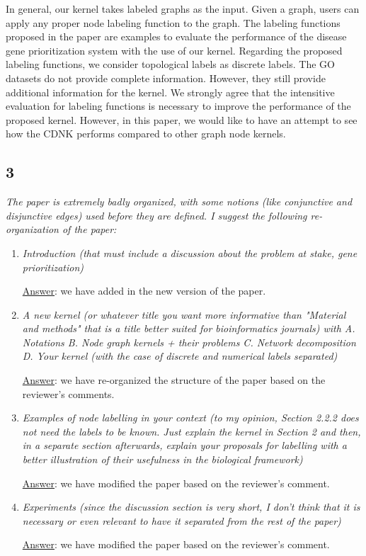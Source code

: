 \documentclass[11pt]{article}
\begin{document}
In general, our kernel takes labeled graphs as the input. Given a graph, users can apply any proper node labeling function to the graph.  The labeling functions proposed in the paper are examples to evaluate the performance of the disease gene prioritization system with the use of our kernel. Regarding the proposed labeling functions, we consider topological labels as discrete labels. The GO datasets do not provide complete information. However, they still provide additional information for the kernel. We strongly agree that the intensitive evaluation for labeling functions is necessary to improve the performance of the proposed kernel. However, in this paper, we would like to have an attempt to see how the CDNK performs compared to other graph node kernels.

\subsection*{3} \textit{The paper is extremely badly organized, with some notions (like conjunctive and disjunctive edges) used before they are defined. I suggest the following re-organization of the paper:}

\begin{enumerate}
\item \textit{Introduction (that must include a discussion about the problem at stake, gene prioritization)}

\underline{Answer}: we have added in the new version of the paper.

\item \textit{A new kernel (or whatever title you want more informative than "Material and methods" that is a title better suited for bioinformatics journals) with A. Notations B. Node graph kernels + their problems C. Network decomposition D. Your kernel (with the case of discrete and numerical labels separated)}

\underline{Answer}: we have re-organized the structure of the paper based on the reviewer's comments.

\item \textit{Examples of node labelling in your context (to my opinion, Section 2.2.2 does not need the labels to be known. Just explain the kernel in Section 2 and then, in a separate section afterwards, explain your proposals for labelling with a better illustration of their usefulness in the biological framework)}

\underline{Answer}: we have modified the paper based on the reviewer's comment.

\item \textit{Experiments (since the discussion section is very short, I don't think that it is necessary or even relevant to have it separated from the rest of the paper)}

\underline{Answer}: we have modified the paper based on the reviewer's comment.

\end{enumerate}
\end{document}
